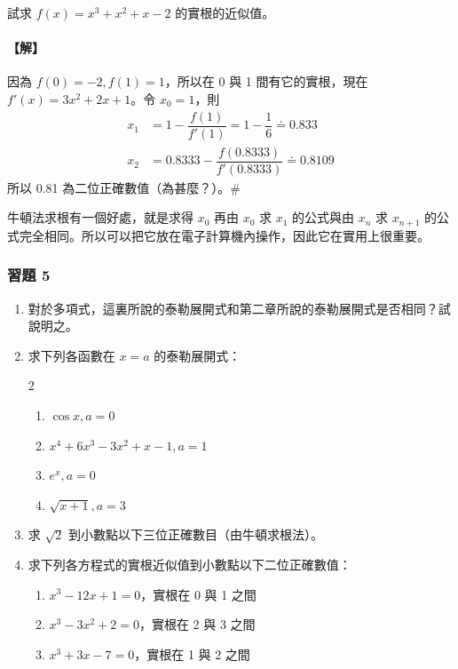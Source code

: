 \begin{example}\label{ex:b6-app4-25}
試求 $f(x)=x^3+x^2+x-2$ 的實根的近似值。
\end{example}

\paragraph{【解】}
因為 $f(0)=-2, f(1)=1$，所以在 0 與 1 間有它的實根，現在 $f'(x)=3x^2+2x+1$。令 $x_0=1$，則
\begin{align*}
x_1 &= 1 - \dfrac{f(1)}{f'(1)} = 1 - \dfrac{1}{6} \doteq 0.833 \\
x_2 &= 0.8333 - \dfrac{f(0.8333)}{f'(0.8333)} \doteq 0.8109
\end{align*}
所以 0.81 為二位正確數值（為甚麼？）。\hfill$\#$

牛頓法求根有一個好處，就是求得 $x_0$ 再由 $x_0$ 求 $x_1$ 的公式與由 $x_n$ 求 $x_{n+1}$ 的公式完全相同。所以可以把它放在電子計算機內操作，因此它在實用上很重要。

\subsubsection*{習題 5}\label{sec:b6-ex-app4-5}

\begin{enumerate}[label=\arabic*., leftmargin=2em]
  \item 對於多項式，這裏所說的泰勒展開式和第二章所說的泰勒展開式是否相同？試說明之。
  \item 求下列各函數在 $x=a$ 的泰勒展開式：
  \begin{multicols}{2}
  \begin{enumerate}[label=\roman*)]
    \item $\cos x, a=0$
    \item $x^4+6x^3-3x^2+x-1, a=1$
    \item $e^x, a=0$
    \item $\sqrt{x+1}, a=3$
  \end{enumerate}
  \end{multicols}
  \item 求 $\sqrt{2}$ 到小數點以下三位正確數目（由牛頓求根法）。
  \item 求下列各方程式的實根近似值到小數點以下二位正確數值：
  \begin{enumerate}[label=\roman*)]
    \item $x^3-12x+1=0$，實根在 0 與 1 之間
    \item $x^3-3x^2+2=0$，實根在 2 與 3 之間
    \item $x^3+3x-7=0$，實根在 1 與 2 之間
  \end{enumerate}
\end{enumerate}

